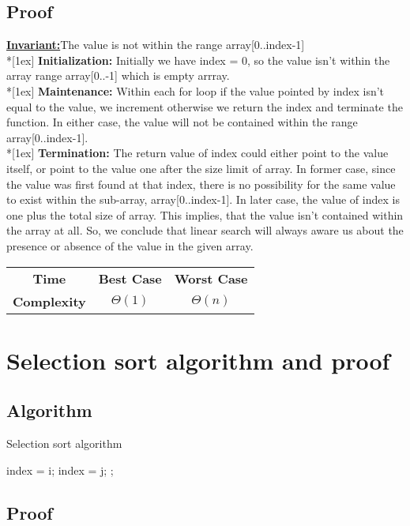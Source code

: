 \documentclass{article}
\newcommand{\Invariant}{\textbf{\underline{Invariant:}}}
\newcommand{\topic}[1]{\textbf{#1:}}
\newcommand{\ls}{\\*[1ex]}
\newcommand{\timecase}[2]{ 
    \vspace{1em}
    \begin{center}
    \begin{tabular}{ |c|c|c| }
    \hline
    \textbf{Time} & \textbf{Best Case} & \textbf{Worst Case} \\ \cline{2-3}
    \textbf{Complexity} & $\Theta \left( #1 \right)$ & $\Theta \left( #2 \right)$ \\ \cline{2-3}
    \hline
    \end{tabular}
    \end{center}
}
\begin{document}
\subsection{Proof}

\Invariant The value is not within the range
array[0..index-1]
\ls
\topic{Initialization} Initially we have index = 0, so the value isn't within the array range array[0..-1] which is empty arrray.
\ls
\topic{Maintenance} Within each for loop if the value pointed by index isn't equal to the value, we increment otherwise we return the index and terminate the function. In either case, the value will not be contained within the range array[0..index-1].
\ls
\topic{Termination} The return value of index could either point to the value itself, or point to the value one after the size limit of array. In former case, since the value was first found at that index, there is no possibility for the same value to exist within the sub-array, array[0..index-1]. In later case, the value of index is one plus the total size of array. This implies, that the value isn't contained within the array at all.
So, we conclude that linear search will always aware us about the presence or absence of the value in the given array.

\timecase{1}{n}

\pagebreak

\section{Selection sort algorithm and proof}

\subsection{Algorithm}

\begin{algorithm}
    \caption{Selection sort algorithm}
    \begin{algorithmic}[1]
        \State index = i;
        \State index = j;
        \EndIf
        \EndFor
        \State {};
        \EndFor
        \EndFunction
    \end{algorithmic}
\end{algorithm}

\subsection{Proof}
\end{document}
